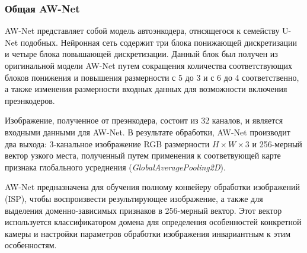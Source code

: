 \subsubsection{Общая AW-Net}

AW-Net представляет собой модель автоэнкодера, отнсящегося к семейству U-Net подобных. Нейронная сеть содержит три блока понижающей дискретизации и четыре блока повышающей дискретизации. Данный блок был получен из оригинальной модели AW-Net путем сокращения количества соответствующих блоков понижения и повышения размерности с 5 до 3 и с 6 до 4 соответственно, а также изменения размерности входных данных для возможности включения преэнкодеров.

Изображение, полученное от преэнкодера, состоит из 32 каналов, и является входными данными для AW-Net. В результате обработки, AW-Net производит два выхода: 3-канальное изображение RGB размерности $H\times W\times 3$ и 256-мерный вектор узкого места, полученный путем применения к соответвующей карте признака глобального усреднения (\textit{GlobalAveragePooling2D}).

AW-Net предназначена для обучения полному конвейеру обработки изображений (ISP), чтобы воспроизвести результирующее изображение, а также для выделения доменно-зависимых признаков в 256-мерный вектор. Этот вектор используется классификатором домена для определения особенностей конкретной камеры и настройки параметров обработки изображения инвариантным к этим особенностям. 
